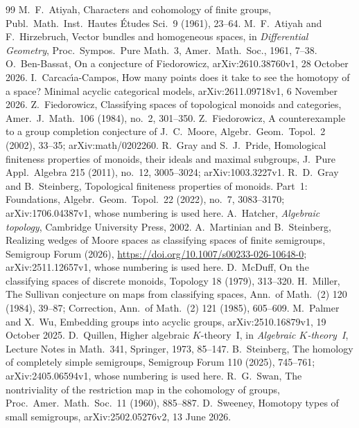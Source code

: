 \documentclass[11pt,a4paper]{article}
\theoremstyle{definition}
\begin{document}
\begin{thebibliography}{99}
 M.~F.~Atiyah, Characters and cohomology of finite groups,
 Publ.\ Math.\ Inst.\ Hautes \'Etudes Sci.\ 9 (1961), 23--64.
 M.~F.~Atiyah and F.~Hirzebruch, Vector bundles and homogeneous
 spaces, in \emph{Differential Geometry}, Proc.\ Sympos.\ Pure Math.\ 3,
 Amer.\ Math.\ Soc., 1961, 7--38.
 O.~Ben-Bassat, On a conjecture of Fiedorowicz,
 arXiv:2610.38760v1, 28 October 2026.
 I.~Carcac\'{\i}a-Campos, How many points does it take to see the
 homotopy of a space? Minimal acyclic categorical models, arXiv:2611.09718v1,
 6 November 2026.
 Z.~Fiedorowicz, Classifying spaces of topological monoids and
 categories, Amer.\ J.\ Math.\ 106 (1984), no.~2, 301--350.
 Z.~Fiedorowicz, A counterexample to a group completion
 conjecture of J.~C.~Moore, Algebr.\ Geom.\ Topol.\ 2 (2002), 33--35;
 arXiv:math/0202260.
 R.~Gray and S.~J.~Pride, Homological finiteness properties of
 monoids, their ideals and maximal subgroups, J.\ Pure Appl.\ Algebra 215
 (2011), no.~12, 3005--3024; arXiv:1003.3227v1.
 R.~D.~Gray and B.~Steinberg, Topological finiteness properties
 of monoids. Part~1: Foundations, Algebr.\ Geom.\ Topol.\ 22 (2022),
 no.~7, 3083--3170; arXiv:1706.04387v1, whose numbering is used here.
 A.~Hatcher, \emph{Algebraic topology}, Cambridge University
 Press, 2002.
 A.~Martinian and B.~Steinberg, Realizing wedges of Moore spaces
 as classifying spaces of finite semigroups, Semigroup Forum (2026),
 \url{https://doi.org/10.1007/s00233-026-10648-0}; arXiv:2511.12657v1, whose
 numbering is used here.
 D.~McDuff, On the classifying spaces of discrete monoids,
 Topology 18 (1979), 313--320.
 H.~Miller, The Sullivan conjecture on maps from classifying
 spaces, Ann.\ of Math.\ (2) 120 (1984), 39--87; Correction, Ann.\ of Math.\
 (2) 121 (1985), 605--609.
 M.~Palmer and X.~Wu, Embedding groups into acyclic groups,
 arXiv:2510.16879v1, 19 October 2025.
 D.~Quillen, Higher algebraic $K$-theory~I, in \emph{Algebraic
 $K$-theory~I}, Lecture Notes in Math.\ 341, Springer, 1973, 85--147.
\bibitem{St} B.~Steinberg, The homology of completely simple semigroups,
 Semigroup Forum 110 (2025), 745--761; arXiv:2405.06594v1, whose numbering is
 used here.
 R.~G.~Swan, The nontriviality of the restriction map in the
 cohomology of groups, Proc.\ Amer.\ Math.\ Soc.\ 11 (1960), 885--887.
\bibitem{Sw} D.~Sweeney, Homotopy types of small semigroups,
 arXiv:2502.05276v2, 13 June 2026.
\end{thebibliography}
\end{document}
